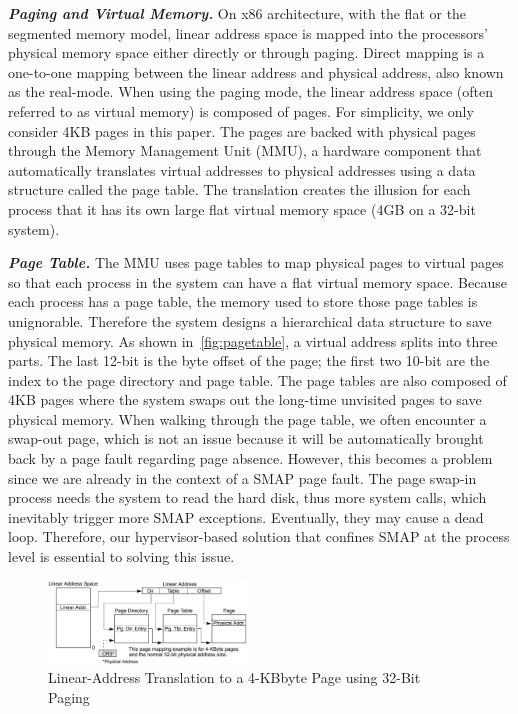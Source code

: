 \textbf{\textit{Paging and Virtual Memory.}} On x86 architecture, with the flat or the segmented memory model, linear address space is mapped into the processors' physical memory space either directly or through paging.  Direct mapping is a one-to-one mapping between the linear address and physical address, also known as the real-mode. When using the paging mode, the linear address space (often referred to as virtual memory) is composed of pages. For simplicity, we only consider 4KB pages in this paper. The pages are backed with physical pages through the Memory Management Unit (MMU), a hardware component that automatically translates virtual addresses to physical addresses using a data structure called the page table. The translation creates the illusion for each process that it has its own large flat virtual memory space (4GB on a 32-bit system).



\textbf{\textit{Page Table.}} The MMU uses page tables to map physical pages to virtual pages~\cite{intelpaging} so that each process in the system can have a flat virtual memory space. Because each process has a page table, the memory used to store those page tables is unignorable. Therefore the system designs a hierarchical data structure to save physical memory. As shown in~\autoref{fig:pagetable}, a virtual address splits into three parts. The last 12-bit is the byte offset of the page;  the first two 10-bit are the index to the page directory and page table. The page tables are also composed of 4KB pages where the system swaps out the long-time unvisited pages to save physical memory. When walking through the page table, we often encounter a swap-out page, which is not an issue because it will be automatically brought back by a page fault regarding page absence. However, this becomes a problem since we are already in the context of a SMAP page fault. The page swap-in process needs the system to read the hard disk, thus more system calls, which inevitably trigger more SMAP exceptions. Eventually, they may cause a dead loop. Therefore, our hypervisor-based solution that confines SMAP at the process level is essential to solving this issue.


\begin{figure}[th]
  \includegraphics[width=0.47\textwidth]{figures/pagetable}
  \centering
  \caption{Linear-Address Translation to a 4-KBbyte Page using 32-Bit Paging~\cite{intelpaging}}
  \label{fig:pagetable}
\end{figure}



